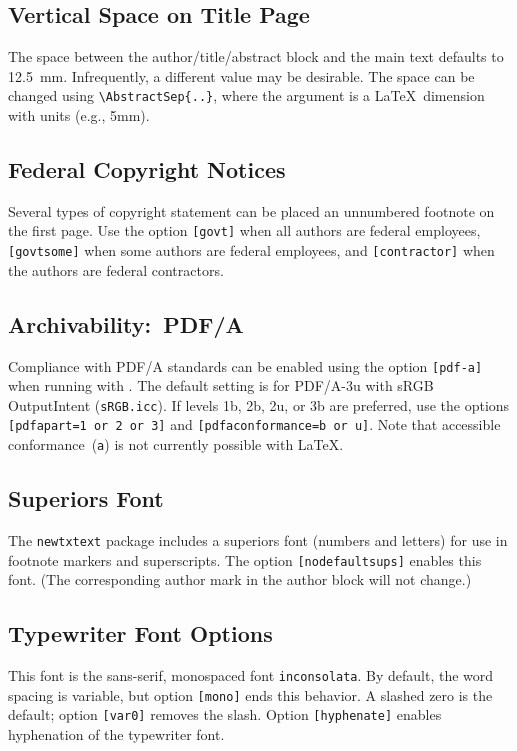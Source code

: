 \documentclass[subscriptcorrection,upint,varvw,mathalfa=cal=euler,barcolor=black,balance,hyphenate,french,pdf-a,nolists]{asmejour}
\begin{document}
\subsection{Vertical Space on Title Page} The space between the author/title/abstract block and the main text defaults to 12.5~mm. Infrequently, a different value may be desirable.  The space can be changed using \verb|\AbstractSep{..}|, where the argument is a \LaTeX\ dimension with units (e.g., 5mm).

\subsection{Federal Copyright Notices} Several types of copyright statement can be placed an unnumbered footnote on the first page. Use the option \texttt{[govt]} when all authors are federal employees, \texttt{[govtsome]} when some authors are federal employees, and \texttt{[contractor]} when the authors are federal contractors.

\subsection{Archivability:~PDF/A} Compliance with PDF/A standards can be enabled using the option \texttt{[pdf-a]}
when running with . The
default setting is for PDF/A-3u with sRGB OutputIntent (\texttt{sRGB.icc}). If levels 1b, 2b, 2u, or 3b are preferred, use the
options \texttt{[pdfapart=1 or 2 or 3]} and  \texttt{[pdfaconformance=b or u]}. Note that accessible
conformance~(\texttt{a}) is not currently possible with \LaTeX.

\subsection{Superiors Font} The \texttt{newtxtext} package includes a superiors font (numbers and letters) for use in footnote markers and superscripts. The option \texttt{[nodefaultsups]} enables this font. (The corresponding author mark in the author block will not change.)

\subsection{Typewriter Font Options} This font is the sans-serif, monospaced font \texttt{inconsolata}. By default, the word spacing is variable, but option \texttt{[mono]} ends this behavior. A slashed zero is the default; option \texttt{[var0]} removes the slash. Option \texttt{[hyphenate]} enables hyphenation of the typewriter font.%
\end{document}

